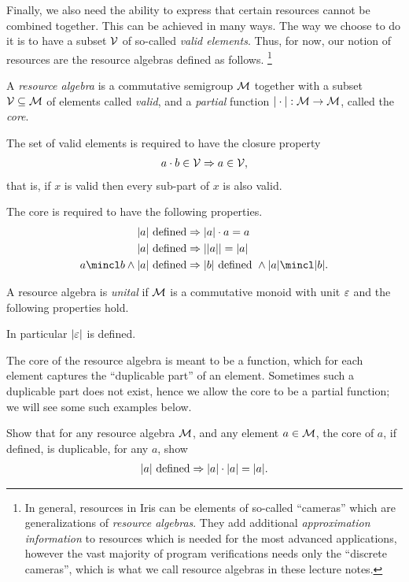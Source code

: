 Finally, we also need the ability to express that certain resources cannot be combined together.
This can be achieved in many ways.
The way we choose to do it is to have a subset $\mathcal{V}$ of so-called \emph{valid elements}.
Thus, for now, our notion of resources are the resource algebras defined as follows.%
\footnote{In general, resources in Iris can be elements of so-called ``cameras'' which are generalizations of \emph{resource algebras}.
  They add additional \emph{approximation information} to resources which is needed for the most advanced applications, however the vast majority of program verifications needs only the ``discrete cameras'', which is what we call resource algebras in these lecture notes.}
\begin{definition}
  \label{def:resource-algebra}
  A \emph{resource algebra} is a commutative semigroup $\mathcal{M}$ together with a subset $\mathcal{V} \subseteq \mathcal{M}$ of elements called \emph{valid}, and a \emph{partial} function ${\mid}\cdot{\mid} : \mathcal{M} \to \mathcal{M}$, called the \emph{core}.

  The set of valid elements is required to have the closure property
  \begin{align*}
    a \cdot b \in \mathcal{V} \Rightarrow a \in \mathcal{V},
  \end{align*}
  that is, if $x$ is valid then every sub-part of $x$ is also valid.
  
  The core is required to have the following properties.
  \begin{align*}
    \mcore{a} \text{ defined} &\implies \mcore{a}\cdot a = a\\
    \mcore{a} \text{ defined} &\implies \mcore{\mcore{a}} = \mcore{a}\\
    a \mincl b \land \mcore{a} \text{ defined} &\implies \mcore{b} \text{ defined } \land \mcore{a} \mincl \mcore{b}.
  \end{align*}

  A resource algebra is \emph{unital} if $\mathcal{M}$ is a commutative monoid with unit $\varepsilon$ and the following properties hold.
  In particular ${\mid}\varepsilon{\mid}$ is defined.
\end{definition}
The core of the resource algebra is meant to be a function, which for each element captures the ``duplicable part'' of an element.
Sometimes such a duplicable part does not exist, hence we allow the core to be a partial function; we will see some such examples below.
\begin{exercise}
  Show that for any resource algebra $\mathcal{M}$, and any element $a \in \mathcal{M}$, the core of $a$, if defined, is duplicable, \ie{} for any $a$, show
  \begin{align*}
    {\mid}a{\mid} \text{ defined} \Rightarrow {\mid}a{\mid} \cdot {\mid}a{\mid} = {\mid}a{\mid}.
  \end{align*}
\end{exercise}


